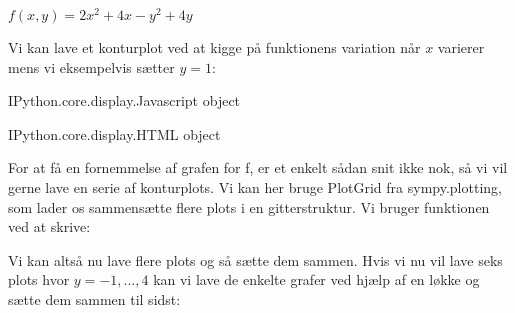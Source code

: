 \documentclass[letterpaper,10pt,english]{jupyterBook}
\begin{document}
\(f(x,y) = 2x^2+ 4x - y^2 + 4y\)

Vi kan lave et konturplot ved at kigge på funktionens variation når \(x\) varierer mens vi eksempelvis sætter \(y = 1\):

\begin{sphinxVerbatim}[commandchars=\\\{\}]
   

                  

    
\end{sphinxVerbatim}

\begin{sphinxVerbatim}[commandchars=\\\{\}]
\PYGZlt{}IPython.core.display.Javascript object\PYGZgt{}
\end{sphinxVerbatim}

\begin{sphinxVerbatim}[commandchars=\\\{\}]
\PYGZlt{}IPython.core.display.HTML object\PYGZgt{}
\end{sphinxVerbatim}

For at få en fornemmelse af grafen for f, er et enkelt sådan snit ikke nok, så vi vil gerne lave en serie af konturplots. Vi kan her bruge PlotGrid fra sympy.plotting, som lader os sammensætte flere plots i en gitterstruktur. Vi bruger funktionen ved at skrive:

\begin{sphinxVerbatim}[commandchars=\\\{\}]
    
\end{sphinxVerbatim}

Vi kan altså nu lave flere plots og så sætte dem sammen. Hvis vi nu vil lave seks plots hvor \(y = -1,...,4\) kan vi lave de enkelte grafer ved hjælp af en løkke og sætte dem sammen til sidst:
\end{document}
